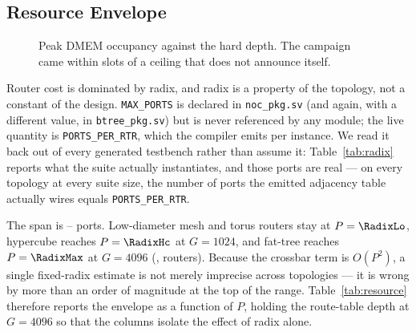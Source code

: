 \documentclass[journal,10pt]{IEEEtran}
\theoremstyle{plain}
\theoremstyle{definition}
\theoremstyle{remark}
\newcommand{\sv}[1]{\texttt{#1}}
\begin{document}
\subsection{Resource Envelope}\label{sec:resource}

\begin{figure}[!t]\centering

\caption{Peak DMEM occupancy against the hard depth. The campaign came within \DmemMargin{} slots of a ceiling that does not announce itself.}\label{fig:dmem}
\end{figure}


Router cost is dominated by radix, and radix is a property of the
topology, not a constant of the design. \sv{MAX\_PORTS} is declared in
\sv{noc\_pkg.sv} (and again, with a different value, in \sv{btree\_pkg.sv})
but is never referenced by any module; the live quantity is
\sv{PORTS\_PER\_RTR}, which the compiler emits per instance. We read it back
out of every generated testbench rather than assume it:
Table~\ref{tab:radix} reports what the suite actually instantiates, and
those ports are real --- on every topology at every suite size, the number
of ports the emitted adjacency table actually wires equals
\sv{PORTS\_PER\_RTR}.

\begin{table}[!t]
\caption{Measured router radix across the 40-instance suite, read from the
  \sv{PPR} localparam of each emitted testbench. Radix is a topology
  property; \sv{MAX\_PORTS} in \sv{noc\_pkg.sv} is vestigial and enforces
  nothing.}
\label{tab:radix}
\centering
\footnotesize

\end{table}

The span is \RadixMin--\RadixMax{} ports. Low-diameter mesh and torus
routers stay at $P = \RadixLo$, hypercube reaches $P = \RadixHc$ at
$G = 1024$, and fat-tree reaches $P = \RadixMax$ at $G = 4096$
(\RadixMaxInst, \RadixMaxRouters{} routers). Because the crossbar term is
$O(P^2)$, a single fixed-radix estimate is not merely imprecise across
topologies --- it is wrong by more than an order of magnitude at the top of
the range. Table~\ref{tab:resource} therefore reports the envelope as a
function of $P$, holding the route-table depth at $G = 4096$ so that the
columns isolate the effect of radix alone.

\begin{table}[!t]
\caption{Per-router resource estimate as a function of radix $P$, at a
  common route-table depth $G = 4096$ and the FIFO depth the campaign
  instantiates ($\sv{BUF\_DEPTH} = \BufDepthSim$, not the RTL default of
  \BufDepthRtl). A research-prototype envelope (storage-equivalent bits; the
  crossbar row prices mux storage-equivalent, not registers); no
  post-place-and-route data.}
\label{tab:resource}
\centering
\footnotesize
\renewcommand{\arraystretch}{1.15}
\resizebox{\columnwidth}{!}{%
%
}
\end{table}
\end{document}
